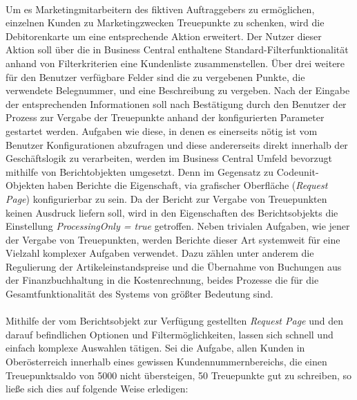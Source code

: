 \paragraph{}
Um es Marketingmitarbeitern des fiktiven Auftraggebers zu ermöglichen, einzelnen Kunden zu Marketingzwecken Treuepunkte zu schenken, wird die Debitorenkarte um eine entsprechende Aktion erweitert. Der Nutzer dieser Aktion soll über die in Business Central enthaltene Standard-Filterfunktionalität anhand von Filterkriterien eine Kundenliste zusammenstellen. Über drei weitere für den Benutzer verfügbare Felder sind die zu vergebenen Punkte, die verwendete Belegnummer, und eine Beschreibung zu vergeben. Nach der Eingabe der entsprechenden Informationen soll nach Bestätigung durch den Benutzer der Prozess zur Vergabe der Treuepunkte anhand der konfigurierten Parameter gestartet werden. Aufgaben wie diese, in denen es einerseits nötig ist vom Benutzer Konfigurationen abzufragen und diese andererseits direkt innerhalb der Geschäftslogik zu verarbeiten, werden im Business Central Umfeld bevorzugt mithilfe von Berichtobjekten umgesetzt. Denn im Gegensatz zu Codeunit-Objekten haben Berichte die Eigenschaft, via grafischer Oberfläche (\textit{Request Page}) konfigurierbar zu sein. Da der Bericht zur Vergabe von Treuepunkten keinen Ausdruck liefern soll, wird in den Eigenschaften des Berichtsobjekts die Einstellung \textit{ProcessingOnly = true} getroffen. Neben trivialen Aufgaben, wie jener der Vergabe von Treuepunkten, werden Berichte dieser Art systemweit für eine Vielzahl komplexer Aufgaben verwendet. Dazu zählen unter anderem die Regulierung der Artikeleinstandspreise und die Übernahme von Buchungen aus der Finanzbuchhaltung in die Kostenrechnung, beides Prozesse die für die Gesamtfunktionalität des Systems von größter Bedeutung sind.

\paragraph{}
Mithilfe der vom Berichtsobjekt zur Verfügung gestellten \textit{Request Page} und den darauf befindlichen Optionen und Filtermöglichkeiten, lassen sich schnell und einfach komplexe Auswahlen tätigen. Sei die Aufgabe, allen Kunden in Oberösterreich innerhalb eines gewissen Kundennummernbereichs, die einen Treuepunktsaldo von 5000 nicht übersteigen, 50 Treuepunkte gut zu schreiben, so ließe sich dies auf folgende Weise erledigen:

